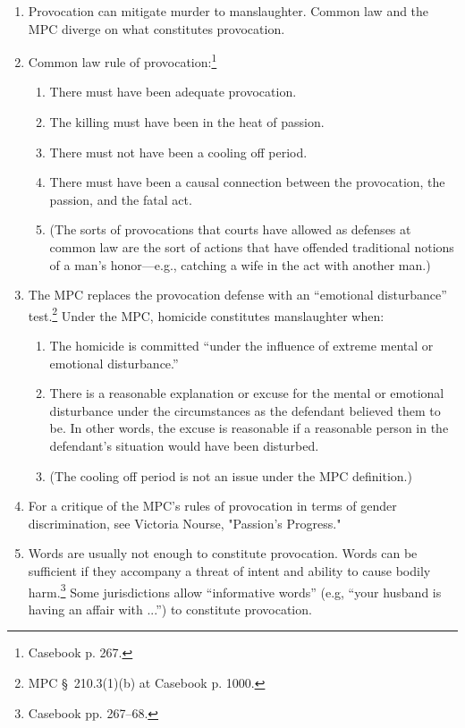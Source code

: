 \begin{enumerate}
    \item Provocation can mitigate murder to manslaughter. Common law and the MPC diverge on what constitutes provocation.
    \item Common law rule of provocation:\footnote{Casebook p. 267.}
    \begin{enumerate}
        \item There must have been adequate provocation.
        \item The killing must have been in the heat of passion.
        \item There must not have been a cooling off period.
        \item There must have been a causal connection between the provocation, the passion, and the fatal act.
        \item (The sorts of provocations that courts have allowed as defenses at common law are the sort of actions that have offended traditional notions of a man's honor---e.g., catching a wife in the act with another man.)
    \end{enumerate}
    \item The MPC replaces the provocation defense with an ``emotional disturbance'' test.\footnote{MPC § 210.3(1)(b) at Casebook p. 1000.} Under the MPC, homicide constitutes manslaughter when:
    \begin{enumerate}
        \item The homicide is committed ``under the influence of extreme mental or emotional disturbance.''
        \item There is a reasonable explanation or excuse for the mental or emotional disturbance under the circumstances as the defendant believed them to be. In other words, the excuse is reasonable if a reasonable person in the defendant's situation would have been disturbed.
        \item (The cooling off period is not an issue under the MPC definition.)
    \end{enumerate}
    \item For a critique of the MPC's rules of provocation in terms of gender discrimination, see Victoria Nourse, "Passion's Progress."
    \item Words are usually not enough to constitute provocation. Words can be sufficient if they accompany a threat of intent and ability to cause bodily harm.\footnote{Casebook pp. 267--68.} Some jurisdictions allow ``informative words'' (e.g, ``your husband is having an affair with ...'') to constitute provocation.
\end{enumerate}

